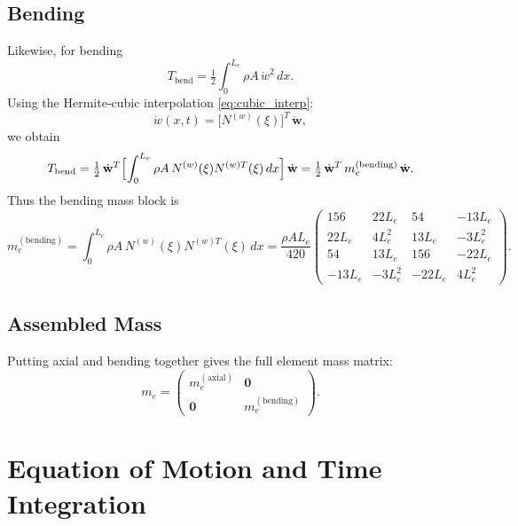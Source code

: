 \documentclass{article}
\begin{document}
	\subsection{Bending}
	Likewise, for bending
	\begin{equation}
		T_{\mathrm{bend}}
		= \tfrac12\int_0^{L_e}\rho A\,\dot w^2\,dx.
	\end{equation}
	Using the Hermite‐cubic interpolation \eqref{eq:cubic_interp}:
	\begin{equation}
		\dot w(x,t)
		= \bigl[N^{(w)}(\xi)\bigr]^T\,\dot{\mathbf{w}},
	\end{equation}
	we obtain
	\begin{equation}
		T_{\mathrm{bend}}
		= \tfrac12\,\dot{\mathbf{w}}^T
		\Bigl[\int_0^{L_e}\rho A\,N^{(w)}(\xi)N^{(w)T}(\xi)\,dx\Bigr]
		\,\dot{\mathbf{w}}
		= \tfrac12\,\dot{\mathbf{w}}^T\,m_e^{(\mathrm{bending})}\,\dot{\mathbf{w}}.
	\end{equation}
	Thus the bending mass block is
	\begin{equation}\label{eq:me_bending}
		m_e^{(\mathrm{bending})}
		= \int_0^{L_e}\rho A\,N^{(w)}(\xi)N^{(w)T}(\xi)\,dx
		= \frac{\rho A L_e}{420}
		\begin{pmatrix}
			156 & 22L_e & 54 & -13L_e\\
			22L_e & 4L_e^2 & 13L_e & -3L_e^2\\
			54 & 13L_e & 156 & -22L_e\\
			-13L_e & -3L_e^2 & -22L_e & 4L_e^2
		\end{pmatrix}.
	\end{equation}
	
	\subsection{Assembled Mass}
	Putting axial and bending together gives the full element mass matrix:
	\begin{equation}\label{eq:me_assembled}
		m_e
		= \begin{pmatrix}
			m_e^{(\mathrm{axial})} & \mathbf{0}\\
			\mathbf{0}            & m_e^{(\mathrm{bending})}
		\end{pmatrix}.
	\end{equation}
	
	\section{Equation of Motion and Time Integration}
	
\end{document}
